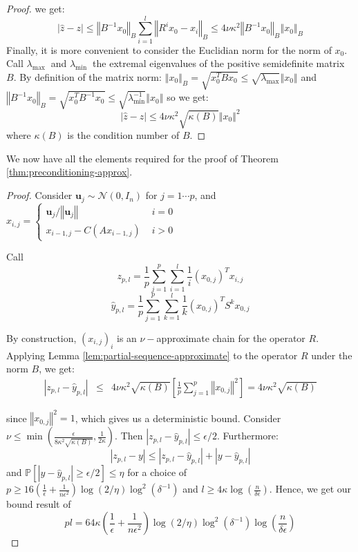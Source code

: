\begin{proof}
we get: 
\[
\left|\hat{z}-z\right|\leq\left\Vert B^{-1}x_{0}\right\Vert _{B}\sum_{i=1}^{l}\left\Vert R^{i}x_{0}-x_{i}\right\Vert _{B}\leq4\nu\kappa^{2}\left\Vert B^{-1}x_{0}\right\Vert _{B}\left\Vert x_{0}\right\Vert _{B}
\]
Finally, it is more convenient to consider the Euclidian norm for
the norm of $x_{0}$. Call $\lambda_{\text{max }}$ and $\lambda_{\text{min }}$
the extremal eigenvalues of the positive semidefinite matrix $B$.
By definition of the matrix norm: $\left\Vert x_{0}\right\Vert _{B}=\sqrt{x_{0}^{T}Bx_{0}}\leq\sqrt{\lambda_{\text{max}}}\left\Vert x_{0}\right\Vert $
and $\left\Vert B^{-1}x_{0}\right\Vert _{B}=\sqrt{x_{0}^{T}B^{-1}x_{0}}\leq\sqrt{\lambda_{\text{min}}^{-1}}\left\Vert x_{0}\right\Vert $
so we get:
\[
\left|\hat{z}-z\right|\leq4\nu\kappa^{2}\sqrt{\kappa\left(B\right)}\left\Vert x_{0}\right\Vert ^{2}
\]
where $\kappa\left(B\right)$ is the condition number of $B$. \end{proof}

We now have all the elements required for the proof of Theorem \ref{thm:preconditioning-approx}.

\begin{proof}

Consider $\mathbf{u}_{j}\sim\mathcal{N}\left(0,I_{n}\right)$ for
$j=1\cdots p$, and $x_{i,j}=\begin{cases}
\mathbf{u}_{j}/\left\Vert \mathbf{u}_{j}\right\Vert  & \,\, i=0\\
x_{i-1,j}-C\left(Ax_{i-1,j}\right) & \,\, i>0
\end{cases}$

Call 
\[
z_{p,l}=\frac{1}{p}\sum_{j=1}^{p}\sum_{i=1}^{l}\frac{1}{i}\left(x_{0,j}\right)^{T}x_{i,j}
\]
\[
\hat{y}_{p,l}=\frac{1}{p}\sum_{j=1}^{p}\sum_{k=1}^{l}\frac{1}{k}\left(x_{0,j}\right)^{T}S^{k}x_{0,j}
\]


By construction, $\left(x_{i,j}\right)_{i}$ is an $\nu-$approximate
chain for the operator $R$. Applying Lemma \ref{lem:partial-sequence-approximate}
to the operator $R$ under the norm $B$, we get:
\begin{eqnarray*}
\left|z_{p,l}-\hat{y}_{p,l}\right| & \leq & 4\nu\kappa^{2}\sqrt{\kappa\left(B\right)}\left[\frac{1}{p}\sum_{j=1}^{p}\left\Vert x_{0,j}\right\Vert ^{2}\right]=4\nu\kappa^{2}\sqrt{\kappa\left(B\right)}
\end{eqnarray*}


since $\left\Vert x_{0,j}\right\Vert ^{2}=1$, which gives us a deterministic
bound. Consider $\nu\leq\min\left(\frac{\epsilon}{8\kappa^{2}\sqrt{\kappa\left(B\right)}},\frac{1}{2\kappa}\right)$.
Then $\left|z_{p,l}-\hat{y}_{p,l}\right|\leq\epsilon/2$. Furthermore:
\[
\left|z_{p,l}-y\right|\leq\left|z_{p,l}-\hat{y}_{p,l}\right|+\left|y-\hat{y}_{p,l}\right|
\]
and $\mathbb{P}\left[\left|y-\hat{y}_{p,l}\right|\geq\epsilon/2\right]\leq\eta$
for a choice of $p\geq16\left(\frac{1}{\epsilon}+\frac{1}{n\epsilon^{2}}\right)\log\left(2/\eta\right)\log^{2}\left(\delta^{-1}\right)$
and $l\geq4\kappa\log\left(\frac{n}{\delta\epsilon}\right)$. Hence,
we get our bound result of 
\[
pl=64\kappa\left(\frac{1}{\epsilon}+\frac{1}{n\epsilon^{2}}\right)\log\left(2/\eta\right)\log^{2}\left(\delta^{-1}\right)\log\left(\frac{n}{\delta\epsilon}\right)
\]


\end{proof}
